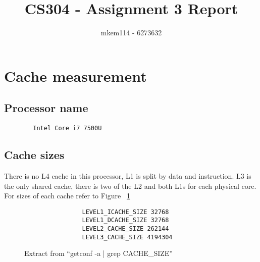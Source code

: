 \documentclass[10pt,a4paper]{article}
\author{mkem114 - 6273632}
\title{CS304 - Assignment 3 Report}
\begin{document}
    \maketitle

    \section{Cache measurement}
    \subsection{Processor name}
    \begin{verbatim}
        Intel Core i7 7500U
    \end{verbatim}

    \subsection{Cache sizes}
    There is no L4 cache in this processor, L1 is split by data and instruction. L3 is the only shared cache, there is two of the L2 and both L1s for each physical core. For sizes of each cache refer to Figure ~\ref{cachesize}
    \begin{figure}[h!]
        \begin{mdframed}
            \begin{verbatim}
                LEVEL1_ICACHE_SIZE 32768
                LEVEL1_DCACHE_SIZE 32768
                LEVEL2_CACHE_SIZE 262144
                LEVEL3_CACHE_SIZE 4194304
            \end{verbatim}
        \end{mdframed}
        \caption{Extract from ``getconf -a | grep CACHE\_SIZE''}
        \label{cachesize}
    \end{figure}
\end{document}
